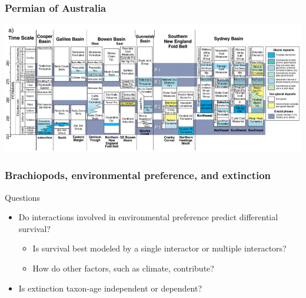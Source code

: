 \documentclass{beamer}
\begin{document}
\begin{frame}
  \frametitle{Permian of Australia}
  \begin{center}
    \includegraphics[height = 0.8\textheight, width = \textwidth, keepaspectratio = true]{figure/glacial}

    \tiny{}
  \end{center}
\end{frame}

\begin{frame}
  \frametitle{Brachiopods, environmental preference, and extinction}

  \begin{block}{Questions}
    \begin{itemize}
      \item Do interactions involved in environmental preference predict differential survival?
        \begin{itemize}
          \item Is survival best modeled by a single interactor or multiple interactors? 
          \item How do other factors, such as climate, contribute?
        \end{itemize}
      \item Is extinction taxon-age independent or dependent?
    \end{itemize}
  \end{block}
\end{frame}
\end{document}
